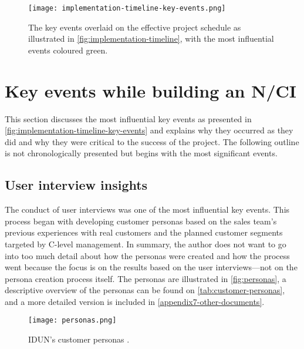 \begin{figure}[!ht]
  \centering
  \texttt{[image: implementation-timeline-key-events.png]}
  \caption{The key events overlaid on the effective project schedule as illustrated in \autoref{fig:implementation-timeline}, with the most influential events coloured green.}
  \label{fig:implementation-timeline-key-events}
\end{figure}

\section{Key events while building an N/CI}
\label{chapter4-key-events}

This section discusses the most influential key events as presented in \autoref{fig:implementation-timeline-key-events} and explains why they occurred as they did and why they were critical to the success of the project. The following outline is not chronologically presented but begins with the most significant events.

\subsection{User interview insights}
\label{chapter4-user-interview-insights}

The conduct of user interviews was one of the most influential key events. This process began with developing customer personas based on the sales team’s previous experiences with real customers and the planned customer segments targeted by C-level management. In summary, the author does not want to go into too much detail about how the personas were created and how the process went because the focus is on the results based on the user interviews—not on the persona creation process itself. The personas are illustrated in \autoref{fig:personas}, a descriptive overview of the personas can be found on \autoref{tab:customer-personas}, and a more detailed version is included in \autoref{appendix7-other-documents}.

\begin{figure}[!ht]
  \centering
  \texttt{[image: personas.png]}
  \caption[IDUN’s customer personas.]{IDUN’s customer personas \citep{idun_guardian_nodate}.}
  \label{fig:personas}
\end{figure}

